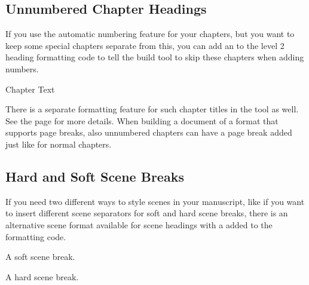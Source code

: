 \documentclass[a4paper,11pt,english]{sphinxmanual}
\begin{document}
\subsection{Unnumbered Chapter Headings}
\label{\detokenize{project_structure:unnumbered-chapter-headings}}\label{\detokenize{project_structure:a-struct-heads-unnum}}
\sphinxAtStartPar
If you use the automatic numbering feature for your chapters, but you want to keep some special
chapters separate from this, you can add an \sphinxcode{\sphinxupquote{!}} to the level 2 heading formatting code to tell
the build tool to skip these chapters when adding numbers.

\begin{sphinxVerbatim}[commandchars=\\\{\}]

Chapter Text
\end{sphinxVerbatim}

\sphinxAtStartPar
There is a separate formatting feature for such chapter titles in the  tool as
well. See the {\hyperref[\detokenize{project_manuscript:a-manuscript}]{}} page for more details. When building a document of a format that
supports page breaks, also unnumbered chapters can have a page break added just like for normal
chapters.


\subsection{Hard and Soft Scene Breaks}
\label{\detokenize{project_structure:hard-and-soft-scene-breaks}}\label{\detokenize{project_structure:a-struct-heads-scenes}}
\sphinxAtStartPar
If you need two different ways to style scenes in your manuscript, like if you want to insert
different scene separators for soft and hard scene breaks, there is an alternative scene format
available for scene headings with a \sphinxcode{\sphinxupquote{!}} added to the formatting code.

\begin{sphinxVerbatim}[commandchars=\\\{\}]

A soft scene break.


A hard scene break.
\end{sphinxVerbatim}
\end{document}
